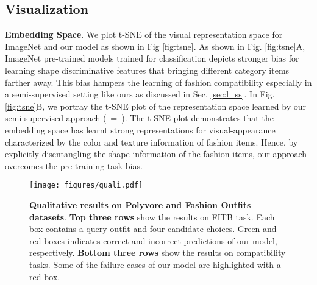 \documentclass[sigconf]{acmart}
\begin{document}
\subsection{Visualization}
\begin{comment}
\noindent \textbf{Embedding Space}. We plot t-SNE \cite{tsne} of the visual representation space  for ImageNet and our model as shown in Fig. \ref{fig:tsne_a} and Fig. \ref{fig:tsne_b}. As shown in Fig. \ref{fig:tsne_a}, ImageNet pre-trained models trained for classification depicts stronger bias for learning shape discriminative features that bringing different category items farther away. This bias hampers the learning of fashion compatibility especially in a semi-supervised setting like ours as discussed in Sec. \ref{sec:l_ss}. In Fig. \ref{fig:tsne_b}, we portray the t-SNE plot of the representation space learned by our semi-supervised approach (~=~). The t-SNE plot demonstrates that the embedding space has learnt strong representations for visual-appearance characterized by the color and texture information of fashion items. Hence, by explicitly disentangling the shape information of the fashion items, our approach overcomes the pre-training task bias. 
\end{comment}

\noindent \textbf{Embedding Space}. We plot t-SNE \cite{tsne} of the visual representation space  for ImageNet and our model as shown in Fig \ref{fig:tsne}. As shown in Fig. \ref{fig:tsne}{A}, ImageNet pre-trained models trained for classification depicts stronger bias for learning shape discriminative features that bringing different category items farther away. This bias hampers the learning of fashion compatibility especially in a semi-supervised setting like ours as discussed in Sec. \ref{sec:l_ss}. In Fig. \ref{fig:tsne}{B}, we portray the t-SNE plot of the representation space learned by our semi-supervised approach (~=~). The t-SNE plot demonstrates that the embedding space has learnt strong representations for visual-appearance characterized by the color and texture information of fashion items. Hence, by explicitly disentangling the shape information of the fashion items, our approach overcomes the pre-training task bias. 

\begin{figure*}[t]
    \centering
    \texttt{[image: figures/quali.pdf]}
    \caption{{\bf Qualitative results on Polyvore and Fashion Outfits datasets}. \textbf{Top three rows} show the results on FITB task. Each box contains a query outfit and four candidate choices. Green and red boxes indicates correct and incorrect predictions of our model, respectively. \textbf{Bottom three rows} show the results on compatibility tasks. Some of the failure cases of our model are highlighted with a red box.}
    \label{fig:wm_quali}
\end{figure*}
\end{document}

